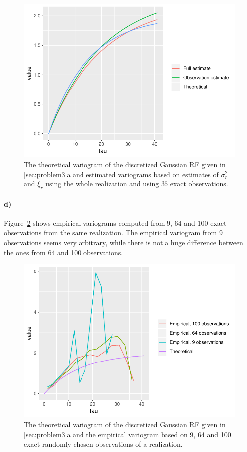\begin{figure}
    \centering
    \includegraphics[scale=0.95]{figures/3c_variogram_estimates.pdf}
    \caption{The theoretical variogram of the discretized Gaussian RF given in \ref{sec:problem3}a and estimated variograms based on estimates of $\sigma_r^2$ and $\xi_r$ using the whole realization and using 36 exact observations.}
    \label{fig:3c_variogram_estimates}
\end{figure}

\paragraph{d)}
Figure~\ref{fig:3d_variogram_obss} shows empirical variograms computed from 9, 64 and 100 exact observations from the same realization. The empirical variogram from 9 observations seems very arbitrary, while there is not a huge difference between the ones from 64 and 100 observations.

\begin{figure}
    \centering
    \includegraphics[scale=0.95]{figures/3d_variogram_obss.pdf}
    \caption{The theoretical variogram of the discretized Gaussian RF given in \ref{sec:problem3}a and the empirical variogram based on 9, 64 and 100 exact randomly chosen observations of a realization.}
    \label{fig:3d_variogram_obss}
\end{figure}

